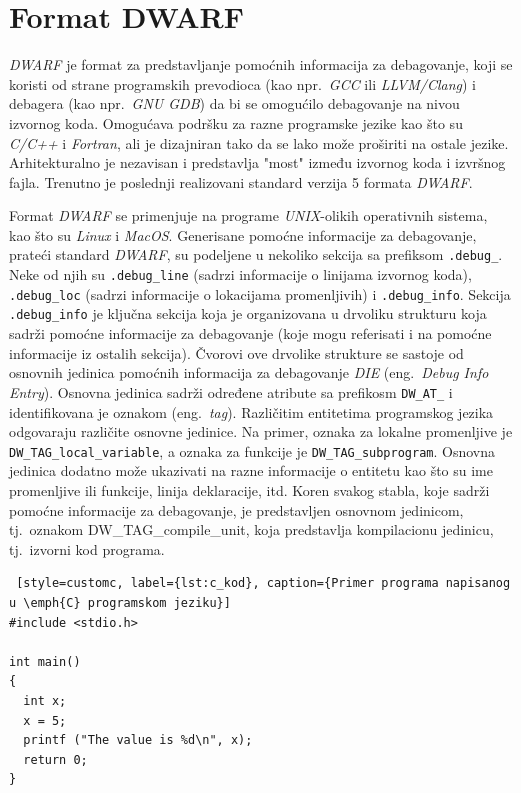 \documentclass[12pt,oneside]{memoir}
\begin{document}
\section{Format DWARF}

\emph{DWARF} je format za predstavljanje pomoćnih informacija za debagovanje, koji se koristi od strane programskih prevodioca (kao npr.~\emph{GCC} ili \emph{LLVM/Clang}) i debagera (kao npr.~\emph{GNU GDB}) da bi se omogućilo debagovanje na nivou izvornog koda. Omogućava podršku za razne programske jezike kao što su \emph{C/C++} i \emph{Fortran}, ali je dizajniran tako da se lako može proširiti na ostale jezike. Arhitekturalno je nezavisan i predstavlja "most" između izvornog koda i izvršnog fajla. Trenutno je poslednji realizovani standard verzija 5 formata \emph{DWARF}.

Format \emph{DWARF} se primenjuje na programe \emph{UNIX}-olikih operativnih sistema, kao što su \emph{Linux} i \emph{MacOS}. Generisane pomoćne informacije za debagovanje, prateći standard \emph{DWARF}, su podeljene u nekoliko sekcija sa prefiksom \texttt{.debug\_}. Neke od njih su \texttt{.debug\_line} (sadrzi informacije o linijama izvornog koda), \texttt{.debug\_loc} (sadrzi informacije o lokacijama promenljivih) i \texttt{.debug\_info}. Sekcija \texttt{.debug\_info} je ključna sekcija koja je organizovana u drvoliku strukturu koja sadrži pomoćne informacije za debagovanje (koje mogu referisati i na pomoćne informacije iz ostalih sekcija). Čvorovi ove drvolike strukture se sastoje od osnovnih jedinica pomoćnih informacija za debagovanje \emph{DIE} (eng.~\emph{Debug Info Entry}). Osnovna jedinica sadrži određene atribute sa prefikosm \texttt{DW\_AT\_} i identifikovana je oznakom (eng.~\emph{tag}). Različitim entitetima programskog jezika odgovaraju različite osnovne jedinice. Na primer, oznaka za lokalne promenljive je \texttt{DW\_TAG\_local\_variable}, a oznaka za funkcije je \texttt{DW\_TAG\_subprogram}. Osnovna jedinica dodatno može ukazivati na razne informacije o entitetu kao što su ime promenljive ili funkcije, linija deklaracije, itd. Koren svakog stabla, koje sadrži pomoćne informacije za debagovanje, je predstavljen osnovnom jedinicom, tj.~oznakom {DW\_TAG\_compile\_unit}, koja predstavlja kompilacionu jedinicu, tj.~izvorni kod programa.

\begin{lstlisting} [style=customc, label={lst:c_kod}, caption={Primer programa napisanog u \emph{C} programskom jeziku}]
#include <stdio.h>

int main()
{
  int x;
  x = 5;
  printf ("The value is %d\n", x);
  return 0;
}
\end{lstlisting}
\end{document}
